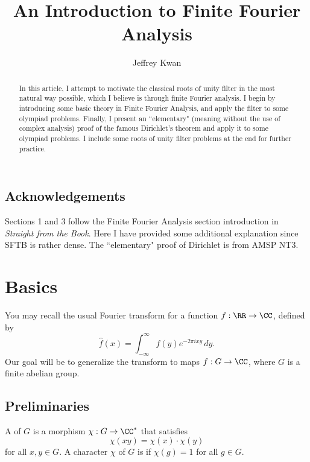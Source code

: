 \documentclass{scrartcl}
\begin{document}
\title{An Introduction to Finite Fourier Analysis}
\author{Jeffrey Kwan}

\maketitle

\begin{abstract}
	In this article, I attempt to motivate the classical roots of unity filter in the most natural 
	way possible, which I believe is through finite Fourier analysis. 
	I begin by introducing some basic theory in Finite Fourier Analysis, and apply the filter 
	to some olympiad problems. Finally, I present an ``elementary" (meaning without the use of  
	complex analysis) proof of the famous Dirichlet's theorem and apply it to some 
	olympiad problems. I include some roots of unity filter problems at the end for further practice. 
\end{abstract}

\subsection*{Acknowledgements}

Sections 1 and 3 follow the Finite Fourier Analysis section introduction in \emph{Straight from the Book}. 
Here I have provided some additional explanation since SFTB is rather dense.  
The ``elementary" proof of Dirichlet is from AMSP NT3.  

\tableofcontents
{}

\eject

\section{Basics}

You may recall the usual Fourier transform for a function $f: \RR \rightarrow \CC$, 
defined by
$$\widehat{f}(x) = \int_{-\infty}^{\infty} f(y) e^{-2\pi ixy} \, dy.$$
Our goal will be to generalize the transform to maps $f: G\rightarrow \CC$, where $G$ 
is a finite abelian group. 

\subsection{Preliminaries}

\begin{definition}
	A  of $G$ is a morphism $\chi: G\rightarrow \CC^\ast$ that satisfies 
	$$\chi(xy) = \chi(x)\cdot \chi(y)$$ 
	for all $x, y\in G$. 
	A character $\chi$ of $G$ is  if $\chi(g) = 1$ for all $g\in G$. 
\end{definition}
\end{document}
